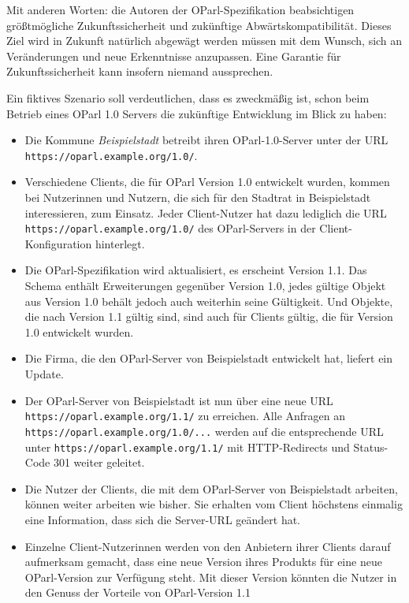 \documentclass[,a4paper]{article}
\begin{document}
Mit anderen Worten: die Autoren der OParl-Spezifikation beabsichtigen
größtmögliche Zukunftssicherheit und zukünftige Abwärtskompatibilität.
Dieses Ziel wird in Zukunft natürlich abgewägt werden müssen mit dem
Wunsch, sich an Veränderungen und neue Erkenntnisse anzupassen. Eine
Garantie für Zukunftssicherheit kann insofern niemand aussprechen.

Ein fiktives Szenario soll verdeutlichen, dass es zweckmäßig ist, schon
beim Betrieb eines OParl 1.0 Servers die zukünftige Entwicklung im Blick
zu haben:

\begin{itemize}
\item
  Die Kommune \emph{Beispielstadt} betreibt ihren OParl-1.0-Server unter
  der URL \texttt{https://oparl.example.org/1.0/}.
\item
  Verschiedene Clients, die für OParl Version 1.0 entwickelt wurden,
  kommen bei Nutzerinnen und Nutzern, die sich für den Stadtrat in
  Beispielstadt interessieren, zum Einsatz. Jeder Client-Nutzer hat dazu
  lediglich die URL \texttt{https://oparl.example.org/1.0/} des
  OParl-Servers in der Client-Konfiguration hinterlegt.
\item
  Die OParl-Spezifikation wird aktualisiert, es erscheint Version 1.1.
  Das Schema enthält Erweiterungen gegenüber Version 1.0, jedes gültige
  Objekt aus Version 1.0 behält jedoch auch weiterhin seine Gültigkeit.
  Und Objekte, die nach Version 1.1 gültig sind, sind auch für Clients
  gültig, die für Version 1.0 entwickelt wurden.
\item
  Die Firma, die den OParl-Server von Beispielstadt entwickelt hat,
  liefert ein Update.
\item
  Der OParl-Server von Beispielstadt ist nun über eine neue URL
  \texttt{https://oparl.example.org/1.1/} zu erreichen. Alle Anfragen an
  \texttt{https://oparl.example.org/1.0/...} werden auf die
  entsprechende URL unter \texttt{https://oparl.example.org/1.1/} mit
  HTTP-Redirects und Status-Code 301 weiter geleitet.
\item
  Die Nutzer der Clients, die mit dem OParl-Server von Beispielstadt
  arbeiten, können weiter arbeiten wie bisher. Sie erhalten vom Client
  höchstens einmalig eine Information, dass sich die Server-URL geändert
  hat.
\item
  Einzelne Client-Nutzerinnen werden von den Anbietern ihrer Clients
  darauf aufmerksam gemacht, dass eine neue Version ihres Produkts für
  eine neue OParl-Version zur Verfügung steht. Mit dieser Version
  könnten die Nutzer in den Genuss der Vorteile von OParl-Version 1.1

\end{itemize}
\end{document}
